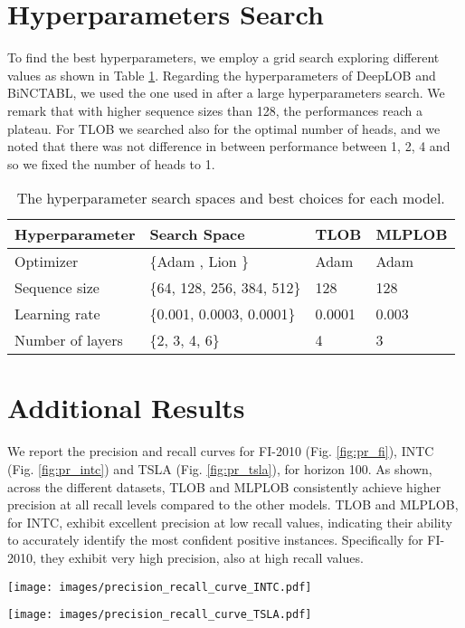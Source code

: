 
\section{Hyperparameters Search}
\label{app:hp}
To find the best hyperparameters, we employ a grid search exploring different values as shown in Table \ref{tab:hp2}. Regarding the hyperparameters of DeepLOB and BiNCTABL, we used the one used in \cite{prata2024lob} after a large hyperparameters search. We remark that with higher sequence sizes than 128, the performances reach a plateau. For TLOB we searched also for the optimal number of heads, and we noted that there was not difference in between performance between 1, 2, 4 and so we fixed the number of heads to 1.
\begin{table}[!h]
\caption{The hyperparameter search spaces and best choices for each model.}
\label{tab:hp2}
\centering
\begin{tabular}{@{}llll@{}}
\toprule
Hyperparameter         & Search Space          & TLOB  & MLPLOB 
\\ \midrule
Optimizer              & \{Adam \cite{diederik2014adam}, Lion \cite{chen2024symbolic}\}  & Adam   & Adam      \\
Sequence size              & \{64, 128, 256, 384, 512\}  & 128 & 128         \\
Learning rate          & \{0.001, 0.0003, 0.0001\}  & 0.0001  & 0.003 \\
Number of layers             & \{2, 3, 4, 6\}  & 4 & 3        \\
\bottomrule
\end{tabular}
\end{table}
\newpage
\section{Additional Results}
We report the precision and recall curves for FI-2010 (Fig. \ref{fig:pr_fi}), INTC (Fig. \ref{fig:pr_intc}) and TSLA (Fig. \ref{fig:pr_tsla}), for horizon 100. As shown, across the different datasets, TLOB and MLPLOB consistently achieve higher precision at all recall levels compared to the other models. TLOB and MLPLOB, for INTC, exhibit excellent precision at low recall values, indicating their ability to accurately identify the most confident positive instances. Specifically for FI-2010, they exhibit very high precision, also at high recall values.
\label{app:results}


\begin{figure*}
    \texttt{[image: images/precision\_recall\_curve\_INTC.pdf]}
    \caption{Precision and Recall curve for INTC for horizon = 100.}
    \label{fig:pr_intc}
\end{figure*}

\begin{figure*}[!h]
    \centering
    \texttt{[image: images/precision\_recall\_curve\_TSLA.pdf]}
    \caption{Precision and Recall curve for TSLA for horizon = 100.}
    \label{fig:pr_tsla}
\end{figure*}
